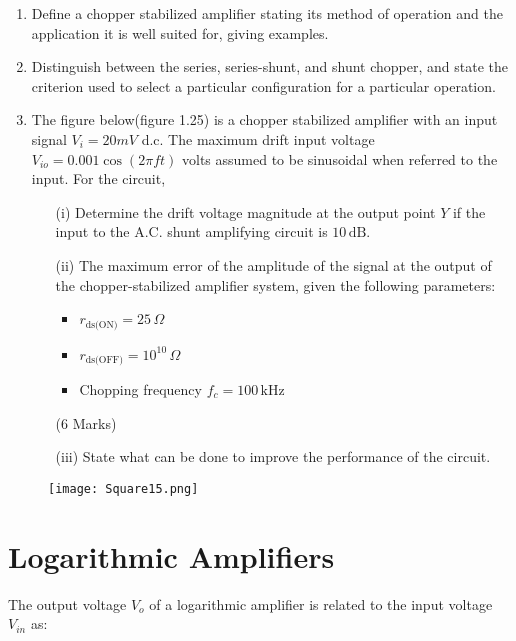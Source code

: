\documentclass[a4paper,9pt,twoside,openany,twocolumn]{memoir}
\begin{document}
\begin{enumerate}
    \item Define a chopper stabilized amplifier stating its method of operation and the application it is well suited for, giving examples.
    \item Distinguish between the series, series-shunt, and shunt chopper, and state the criterion used to select a particular configuration for a particular operation.
    \item The figure below(figure 1.25) is a chopper stabilized amplifier with an input signal $V_i = 20mV$ d.c. The maximum drift input voltage $V_{io} = 0.001 \cos(2\pi f t)$ volts assumed to be sinusoidal when referred to the input. For the circuit, 


\begin{enumerate}
    \item[(i)] Determine the drift voltage magnitude at the output point \( Y \) if the input to the A.C. shunt amplifying circuit is \( 10 \, \text{dB} \).
    
    \item[(ii)] The maximum error of the amplitude of the signal at the output of the chopper-stabilized amplifier system, given the following parameters:
    \begin{itemize}
        \item \( r_{\text{ds(ON)}} = 25 \, \Omega \)
        \item \( r_{\text{ds(OFF)}} = 10^{10} \, \Omega \)
        \item Chopping frequency \( f_c = 100 \, \text{kHz} \)
    \end{itemize}
    (6 Marks)

    \item[(iii)] State what can be done to improve the performance of the circuit.
\end{enumerate}

\end{enumerate}
\begin{figure}[h]
    \centering
    \texttt{[image: Square15.png]}
    \caption{}
\end{figure} 


\chapter{Logarithmic Amplifiers}

The output voltage \( V_o \) of a logarithmic amplifier is related to the input voltage \( V_{in} \) as:
\end{document}
